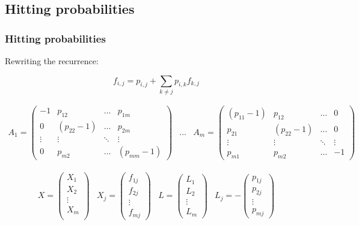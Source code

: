 \subsection{Hitting probabilities}
 \begin{frame}\frametitle{Hitting probabilities}
    \vspace{3em}
    
    Rewriting the recurrence:     
    
    \[
    f_{i,j} = p_{i,j} + \sum_{k\neq j} p_{i,k} f_{k,j}
    \]

    \fontsize{6pt}{0}\selectfont
    \begin{equation*}
    \begin{array}{rcl}
    A_1 = \left(\begin{matrix}
    -1     & p_{12}       & \ldots & p_{1m} \\
    0      & (p_{22} - 1) & \ldots & p_{2m} \\
    \vdots & \vdots       & \ddots & \vdots  \\
    0      & p_{m 2}      & \ldots & (p_{mm} - 1)
    \end{matrix}\right) & \ldots &
    A_m = \left(\begin{matrix}
    (p_{11} - 1) & p_{12}      & \ldots & 0 \\
    p_{21}       & (p_{22} -1) & \ldots & 0 \\
    \vdots        & \vdots     & \ddots & \vdots  \\
    p_{m1}       & p_{m2}      & \ldots & -1
    \end{matrix}\right)
    \end{array}
    \end{equation*}

    \begin{equation*}
    \begin{array}{rlrl}
    X = \left(\begin{array}{c}
    X_1 \\
    X_2 \\
    \vdots \\
    X_m \\
    \end{array}\right) &
    X_j = \left(\begin{array}{c}
    f_{1j} \\
    f_{2j} \\
    \vdots  \\
    f_{mj}
    \end{array}\right) &
    L = \left(\begin{array}{c}
    L_1 \\
    L_2 \\
    \vdots  \\
    L_m
    \end{array}\right) &
    L_j = - \left(\begin{array}{c}
    p_{1j} \\
    p_{2j} \\
    \vdots  \\
    p_{mj}
    \end{array}\right)
    \end{array}
    \end{equation*}
    

\end{frame}
